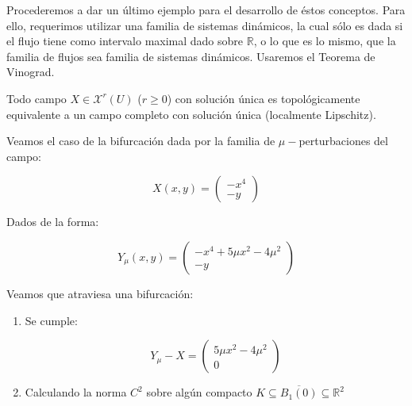 \begin{rmrk}
	Procederemos a dar un último ejemplo para el desarrollo de éstos conceptos. Para ello, requerimos utilizar una familia de sistemas dinámicos, la cual sólo es dada si el flujo tiene como intervalo maximal dado sobre $\mathbb{R}$, o lo que es lo mismo, que la familia de flujos sea familia de sistemas dinámicos. Usaremos el Teorema de Vinograd.
\end{rmrk}

\begin{thm}
	Todo campo $X \in \mathcal{X}^r(U)$ ($r \geq 0$) con solución única es topológicamente equivalente a un campo completo con solución única (localmente Lipschitz).
\end{thm}

\begin{exmp}
	Veamos el caso de la bifurcación dada por la familia de $\mu-$perturbaciones del campo:
	
	\begin{equation*}
		X(x,y) = \begin{pmatrix}
		-x^4\\
		-y
		\end{pmatrix}
	\end{equation*}
	
	Dados de la forma:
	
	\begin{equation*}
		Y_\mu(x,y) = \begin{pmatrix}
			-x^4+5\mu x^2 - 4 \mu^2\\
			-y
		\end{pmatrix}
	\end{equation*}
	
	Veamos que atraviesa una bifurcación:
	
	\begin{enumerate}
		\item Se cumple: 
		
		\begin{equation*}
			Y_\mu - X = \begin{pmatrix}
				5\mu x^2 - 4 \mu^2\\
				0
			\end{pmatrix}
		\end{equation*}
		
		\item Calculando la norma $C^2$ sobre algún compacto $K \subseteq \overline{B_1(0)}\subseteq \mathbb{R}^2$
		

\end{enumerate}
\end{exmp}
